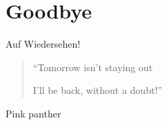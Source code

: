 \AtBeginPart{}
\part{Goodbye}
\begin{frame}[c]{Auf Wiedersehen!}
  \begin{minipage}{0.6\linewidth}
    \begin{quote}
      ``Tomorrow isn't staying out\par
      \phantom{``}I'll be back, without a doubt!''
    \end{quote}
    \hfill Pink panther
  \end{minipage}
\end{frame}
%

